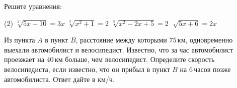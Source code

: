 \begin{class}[number=2]
\begin{listofex}
\begin{tasks}
		\end{tasks}
		\item Решите уравнения:
		\begin{tasks}(2)
			\task \( \sqrt[3]{5x-10} = 3x \)
			\task \( \sqrt[3]{x^2+1}=2 \)
			\task \( \sqrt[3]{x^2-2x+5}=2 \)
			\task \( \sqrt[]{5x+6}=2x \)
		\end{tasks}
		\item Из пункта \(A\) в пункт \(B\), расстояние между которыми \(75\) км, одновременно выехали автомобилист и велосипедист. Известно, что за час автомобилист проезжает на \(40\) км больше, чем велосипедист. Определите скорость велосипедиста, если известно, что он прибыл в пункт \(B\) на \(6\) часов позже автомобилиста. Ответ дайте в км/ч.
	\end{listofex}
\end{class}

